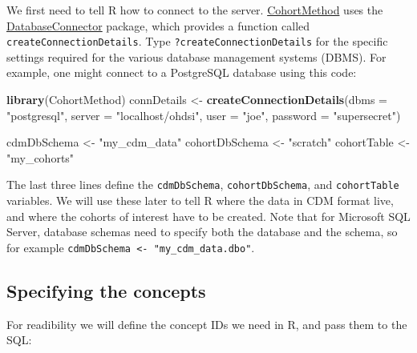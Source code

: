 \documentclass[11pt]{book}
\newenvironment{Shaded}{\begin{snugshade}}{\end{snugshade}}
\newcommand{\DataTypeTok}[1]{\textcolor[rgb]{0.13,0.29,0.53}{#1}}
\newcommand{\KeywordTok}[1]{\textcolor[rgb]{0.13,0.29,0.53}{\textbf{#1}}}
\newcommand{\NormalTok}[1]{#1}
\newcommand{\StringTok}[1]{\textcolor[rgb]{0.31,0.60,0.02}{#1}}
\theoremstyle{definition}
\theoremstyle{definition}
\theoremstyle{definition}
\theoremstyle{remark}
\begin{document}
We first need to tell R how to connect to the server. \href{https://ohdsi.github.io/CohortMethod/}{CohortMethod} uses the \href{https://ohdsi.github.io/DatabaseConnector/}{DatabaseConnector} package, which provides a function called \texttt{createConnectionDetails}. Type \texttt{?createConnectionDetails} for the specific settings required for the various database management systems (DBMS). For example, one might connect to a PostgreSQL database using this code:

\begin{Shaded}
\begin{Highlighting}[]
\KeywordTok{library}\NormalTok{(CohortMethod)}
\NormalTok{connDetails <-}\StringTok{ }\KeywordTok{createConnectionDetails}\NormalTok{(}\DataTypeTok{dbms =} \StringTok{"postgresql"}\NormalTok{,}
                                       \DataTypeTok{server =} \StringTok{"localhost/ohdsi"}\NormalTok{,}
                                       \DataTypeTok{user =} \StringTok{"joe"}\NormalTok{,}
                                       \DataTypeTok{password =} \StringTok{"supersecret"}\NormalTok{)}

\NormalTok{cdmDbSchema <-}\StringTok{ "my_cdm_data"}
\NormalTok{cohortDbSchema <-}\StringTok{ "scratch"}
\NormalTok{cohortTable <-}\StringTok{ "my_cohorts"}
\end{Highlighting}
\end{Shaded}

The last three lines define the \texttt{cdmDbSchema}, \texttt{cohortDbSchema}, and \texttt{cohortTable} variables. We will use these later to tell R where the data in CDM format live, and where the cohorts of interest have to be created. Note that for Microsoft SQL Server, database schemas need to specify both the database and the schema, so for example \texttt{cdmDbSchema\ \textless{}-\ "my\_cdm\_data.dbo"}.

\hypertarget{specifying-the-concepts}{%
\subsection{Specifying the concepts}\label{specifying-the-concepts}}

For readibility we will define the concept IDs we need in R, and pass them to the SQL:
\end{document}
